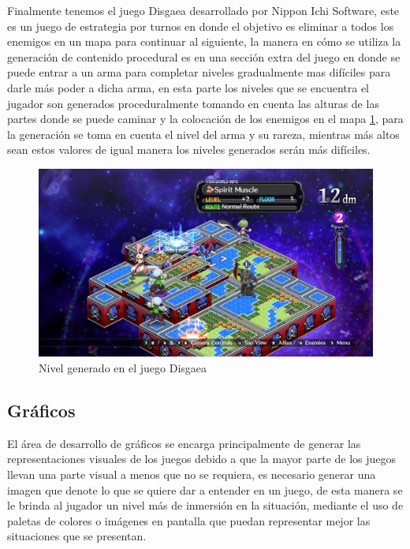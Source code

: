 Finalmente tenemos el juego Disgaea desarrollado por Nippon Ichi Software, este %
es un juego de estrategia por turnos en donde el objetivo es eliminar a todos
los enemigos en un mapa para continuar al siguiente, la manera en cómo se
utiliza la generación de contenido procedural es en una sección extra del juego
en donde se puede entrar a un arma para completar niveles gradualmente mas
difíciles para darle más poder a dicha arma, en esta parte los niveles que se
encuentra el jugador son generados proceduralmente tomando en cuenta las alturas
de las partes donde se puede caminar y la colocación de los enemigos en el mapa
\ref{figure:DisgaeaIW}, para la generación se toma en cuenta el nivel del arma y
su rareza, mientras más altos sean estos valores de igual manera los niveles
generados serán más difíciles.

\begin{figure}
    \centering
    \includegraphics[width=1.0\textwidth]{img/DisgaeaIW.png}
    \caption{Nivel generado en el juego Disgaea}
    \label{figure:DisgaeaIW}
\end{figure}

\subsection{Gráficos}
\label{subsection:Visuals}

El área de desarrollo de gráficos se encarga principalmente de generar las
representaciones visuales de los juegos debido a que la mayor parte de los
juegos llevan una parte visual a menos que no se requiera, es necesario generar
una imagen que denote lo que se quiere dar a entender en un juego, de esta
manera se le brinda al jugador un nivel más de inmersión en la situación,
mediante el uso de paletas de colores o imágenes en pantalla que puedan
representar mejor las situaciones que se presentan.

